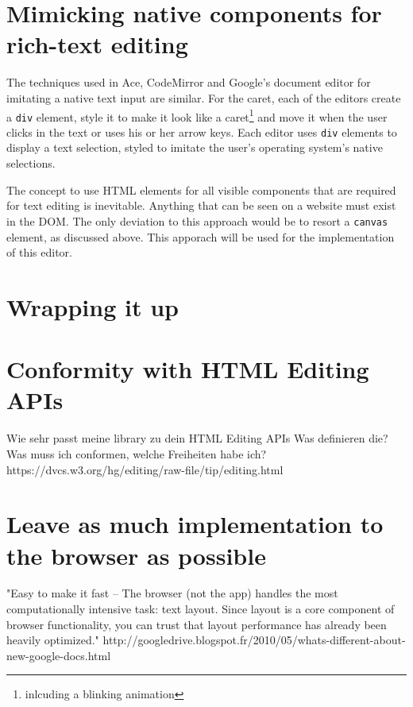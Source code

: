 \section{Mimicking native components for rich-text editing}

The techniques used in Ace, CodeMirror and Google's document editor for imitating a native text input are similar. For the caret, each of the editors create a \texttt{div} element, style it to make it look like a caret\footnote{inlcuding a blinking animation} and move it when the user clicks in the text or uses his or her arrow keys. Each editor uses \texttt{div} elements to display a text selection, styled to imitate the user's operating system's native selections. %

The concept to use HTML elements for all visible components that are required for text editing is inevitable. Anything that can be seen on a website must exist in the DOM. The only deviation to this approach would be to resort a \texttt{canvas} element, as discussed above. This apporach will be used for the implementation of this editor.


\section{Wrapping it up}

\section{Conformity with HTML Editing APIs}
Wie sehr passt meine library zu dein HTML Editing APIs
Was definieren die?
Was muss ich conformen, welche Freiheiten habe ich?
https://dvcs.w3.org/hg/editing/raw-file/tip/editing.html

\section{Leave as much implementation to the browser as possible} 

"Easy to make it fast -- The browser (not the app) handles the most computationally intensive task: text layout. Since layout is a core component of browser functionality, you can trust that layout performance has already been heavily optimized." http://googledrive.blogspot.fr/2010/05/whats-different-about-new-google-docs.html

